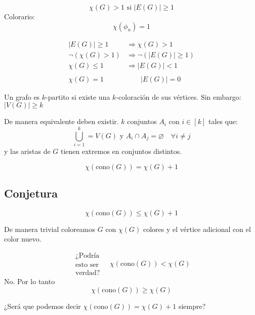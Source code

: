 \documentclass[../main.tex]{subfiles}
\begin{document}
\begin{figure}[H]
	\centering
	\boldmath
	
\end{figure}

\teorema
\[
	\chi(G) > 1 \text{ si }|E(G)|\geq 1
\]
Colorario:
\[
	\chi(\phi_n)=1
\]

\begin{align*}
	|E(G)|\geq 1 &\Rightarrow \chi(G)>1\\
	\neg(\chi(G)>1) &\Rightarrow \neg(|E(G)|\geq 1)\\
	\chi(G) \leq 1 &\Rightarrow |E(G)|<1\\
	\\
	\chi(G)=1 &\qquad |E(G)|=0
\end{align*}

\dobledef
{
	Un grafo es $k$-partito si existe una $k$-coloración de sus vértices.%
}
{%
	Sin embargo: $|V(G)|\geq k$%
}

De manera equivalente deben existir. $k$ conjuntos $A_i$ con $i\in[k]$ tales
que:
\[
	\bigcup_{i=1}^k = V(G) \text{ y } A_i\cap A_j=\varnothing\quad\forall i\neq j
\]
y las aristas de $G$ tienen extremos en conjuntos distintos.

\begin{figure}[H]
	\centering
	\boldmath
	
\end{figure}

\teorema
{}

\conjetura
\[
	\chi(\text{cono}(G))=\chi(G)+1
\]

\subsection*{Conjetura}%
\label{sub:conjetura}

\[
	\chi(\text{cono}(G))\leq\chi(G)+1
\]

\demostracion
De manera trivial coloreamos $G$ con $\chi(G)$ colores y el vértice adicional
con el color nuevo.

\[
	\substack
	{%
		\text{¿Podría}\\
		\text{esto ser}\\
		\text{verdad?}
	}
	\quad
	\chi(\text{cono}(G)) < \chi(G)
\]
No. Por lo tanto
\[
	\chi(\text{cono}(G)) \geq \chi(G)
\]

¿Será que podemos decir $\chi(\text{cono}(G))=\chi(G)+1$ siempre?
\end{document}
